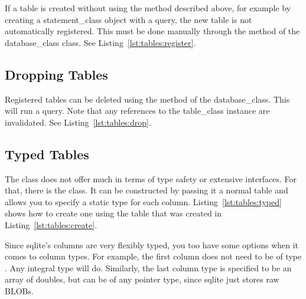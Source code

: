 If a table is created without using the  method described above, for example by creating a \gls{statement_class} object with a  query, the new table is not automatically registered. This must be done manually through the  method of the \gls{database_class} class. See Listing~\ref{lst:tables:register}.



\subsection{Dropping Tables}
\label{section:tables:drop}

Registered tables can be deleted using the  method of the \gls{database_class}. This will run a  query. Note that any references to the \gls{table_class} instance are invalidated. See Listing~\ref{lst:tables:drop}.



\subsection{Typed Tables}
\label{section:tables:typed}

The  class does not offer much in terms of type safety or extensive interfaces. For that, there is the  class. It can be constructed by passing it a normal table and allows you to specify a static type for each column. Listing~\ref{lst:tables:typed} shows how to create one using the table that was created in Listing~\ref{lst:tables:create}.



Since sqlite's columns are very flexibly typed, you too have some options when it comes to column types. For example, the first column does not need to be of type . Any integral type will do. Similarly, the last column type is specified to be an array of doubles, but can be of any pointer type, since sqlite just stores raw BLOBs.

